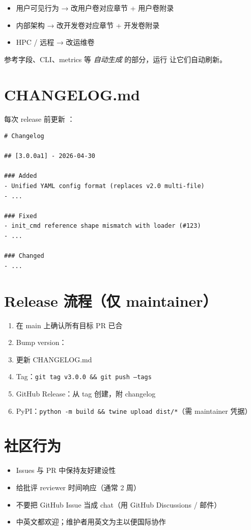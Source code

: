 \begin{itemize}
  \item 用户可见行为 → 改用户卷对应章节 + 用户卷附录
  \item 内部架构 → 改开发卷对应章节 + 开发卷附录
  \item HPC / 远程 → 改运维卷
\end{itemize}

参考字段、CLI、metrics 等 \emph{自动生成} 的部分，运行  让它们自动刷新。

\section{CHANGELOG.md}

每次 release 前更新 ：

\begin{verbatim}
# Changelog

## [3.0.0a1] - 2026-04-30

### Added
- Unified YAML config format (replaces v2.0 multi-file)
- ...

### Fixed
- init_cmd reference shape mismatch with loader (#123)
- ...

### Changed
- ...
\end{verbatim}

\section{Release 流程（仅 maintainer）}

\begin{enumerate}
  \item 在 main 上确认所有目标 PR 已合
  \item Bump version：
  \item 更新 CHANGELOG.md
  \item Tag：\texttt{git tag v3.0.0 \&\& git push --tags}
  \item GitHub Release：从 tag 创建，附 changelog
  \item PyPI：\texttt{python -m build \&\& twine upload dist/*}（需 maintainer 凭据）
\end{enumerate}

\section{社区行为}

\begin{itemize}
  \item Issues 与 PR 中保持友好建设性
  \item 给批评 reviewer 时间响应（通常 2 周）
  \item 不要把 GitHub Issue 当成 chat（用 GitHub Discussions / 邮件）
  \item 中英文都欢迎；维护者用英文为主以便国际协作
\end{itemize}

